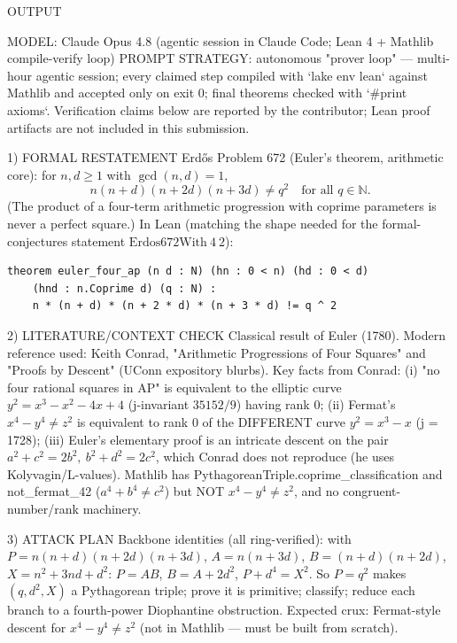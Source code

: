 
OUTPUT

MODEL: Claude Opus 4.8 (agentic session in Claude Code; Lean 4 + Mathlib compile-verify loop)
PROMPT STRATEGY: autonomous "prover loop" — multi-hour agentic session; every claimed step
compiled with `lake env lean` against Mathlib and accepted only on exit 0; final theorems
checked with `#print axioms`. Verification claims below are reported by the contributor;
Lean proof artifacts are not included in this submission.

1) FORMAL RESTATEMENT
Erdős Problem 672 (Euler's theorem, arithmetic core): for $n, d \ge 1$ with $\gcd(n,d)=1$,
\[
n(n+d)(n+2d)(n+3d) \ne q^2 \quad \text{for all } q \in \mathbb{N}.
\]
(The product of a four-term arithmetic progression with coprime parameters is never a perfect
square.) In Lean (matching the shape needed for the formal-conjectures statement
$\mathrm{Erdos672With}\ 4\ 2$):
\begin{verbatim}
theorem euler_four_ap (n d : N) (hn : 0 < n) (hd : 0 < d)
    (hnd : n.Coprime d) (q : N) :
    n * (n + d) * (n + 2 * d) * (n + 3 * d) != q ^ 2
\end{verbatim}

2) LITERATURE/CONTEXT CHECK
Classical result of Euler (1780). Modern reference used: Keith Conrad, "Arithmetic
Progressions of Four Squares" and "Proofs by Descent" (UConn expository blurbs). Key facts
from Conrad: (i) "no four rational squares in AP" is equivalent to the elliptic curve
$y^2=x^3-x^2-4x+4$ (j-invariant $35152/9$) having rank 0; (ii) Fermat's
$x^4-y^4\ne z^2$ is equivalent to rank 0 of the DIFFERENT curve $y^2=x^3-x$ (j = 1728);
(iii) Euler's elementary proof is an intricate descent on the pair
$a^2+c^2=2b^2,\ b^2+d^2=2c^2$, which Conrad does not reproduce (he uses Kolyvagin/L-values).
Mathlib has PythagoreanTriple.coprime_classification and not_fermat_42 ($a^4+b^4\ne c^2$)
but NOT $x^4-y^4\ne z^2$, and no congruent-number/rank machinery.

3) ATTACK PLAN
Backbone identities (all ring-verified): with $P=n(n+d)(n+2d)(n+3d)$, $A=n(n+3d)$,
$B=(n+d)(n+2d)$, $X=n^2+3nd+d^2$: $P=AB$, $B=A+2d^2$, $P+d^4=X^2$.
So $P=q^2$ makes $(q, d^2, X)$ a Pythagorean triple; prove it is primitive; classify;
reduce each branch to a fourth-power Diophantine obstruction. Expected crux: Fermat-style
descent for $x^4-y^4\ne z^2$ (not in Mathlib — must be built from scratch).

